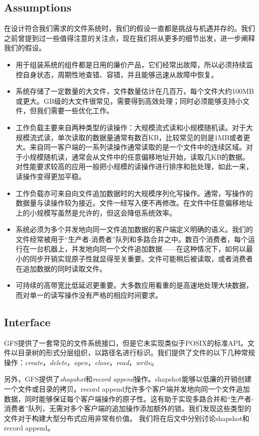 \documentclass{article}
\begin{document}
\subsection{Assumptions}
在设计符合我们需求的文件系统时，我们的假设一直都是挑战与机遇并存的。我们之前曾提到过一些值得注意的关注点，现在我们将从更多的细节出发，进一步阐释我们的假设。
\begin{itemize}
	\item 用于组装系统的组件都是日用的廉价产品，它们经常出故障，所以必须持续监控自身状态，周期性地查错、容错，并且能够迅速从故障中恢复。
	\item 系统存储了一定数量的大文件，文件数量估计在几百万，每个文件大约100MB或更大。GB级的大文件很常见，需要得到高效处理；同时必须能够支持小文件，但我们需要一些优化工作。
	\item 工作负载主要来自两种类型的读操作：大规模流式读和小规模随机读。对于大规模流式读，单次读取的数据量通常有数百KB，比较常见的则是1MB或者更大。来自同一客户端的一系列读操作通常读取的是一个文件中的连续区域。对于小规模随机读，通常会从文件中的任意偏移地址开始，读取几KB的数据。对性能要求较高的应用一般把小规模的读操作进行排序和批处理，如此一来，读操作变得更加平稳。
	\item 工作负载亦可来自向文件追加数据时的大规模序列化写操作。通常，写操作的数据量与读操作较为接近。文件一经写入便不再修改。在文件中任意偏移地址上的小规模写虽然是允许的，但这会降低系统效率。
	\item 系统必须为多个并发地向同一文件追加数据的客户端定义明确的语义。我们的文件经常被用于“生产者-消费者”队列和多路合并之中。数百个消费者，每个运行在一台机器上，并发地向同一个文件追加数据——在这种情况下，如何以最小的同步开销实现原子性就显得至关重要。文件可能稍后被读取，或者消费者在追加数据的同时读取文件。
	\item 可持续的高带宽比低延迟更重要。大多数应用看重的是高速地处理大块数据，而对单一的读写操作没有严格的相应时间要求。
\end{itemize}

\subsection{Interface}
GFS提供了一套常见的文件系统接口，但是它未实现类似于POSIX的标准API。文件以目录树的形式分层组织，以路径名进行标识。我们提供了文件的以下几种常规操作：\emph{create}，\emph{delete}，\emph{open}，\emph{close}，\emph{read}，\emph{write}。\par
另外，GFS提供了\emph{shapshot}和\emph{record append}操作。shapshot能够以低廉的开销创建一个文件或目录的拷贝。record append允许多个客户端并发地向同一个文件追加数据，同时能够保证每个客户端操作的原子性。这有助于实现多路合并和“生产者-消费者”队列，无需对多个客户端的追加操作添加额外的锁。我们发现这些类型的文件对于构建大型分布式应用非常有价值。 我们将在后文中分别讨论shapshot和record append。
\end{document}
